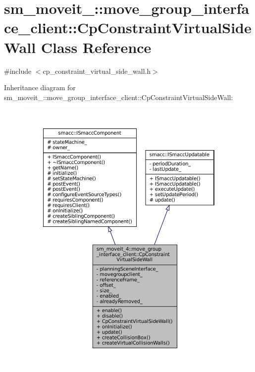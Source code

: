 \hypertarget{classsm__moveit__4_1_1move__group__interface__client_1_1CpConstraintVirtualSideWall}{}\section{sm\+\_\+moveit\+\_\+:\+:move\+\_\+group\+\_\+interface\+\_\+client\+:\+:Cp\+Constraint\+Virtual\+Side\+Wall Class Reference}
\label{classsm__moveit__4_1_1move__group__interface__client_1_1CpConstraintVirtualSideWall}


{\ttfamily \#include $<$cp\+\_\+constraint\+\_\+virtual\+\_\+side\+\_\+wall.\+h$>$}



Inheritance diagram for sm\+\_\+moveit\+\_\+:\+:move\+\_\+group\+\_\+interface\+\_\+client\+:\+:Cp\+Constraint\+Virtual\+Side\+Wall\+:
\nopagebreak
\begin{figure}[H]
\begin{center}
\leavevmode
\includegraphics[width=350pt]{classsm__moveit__4_1_1move__group__interface__client_1_1CpConstraintVirtualSideWall__inherit__graph}
\end{center}
\end{figure}


